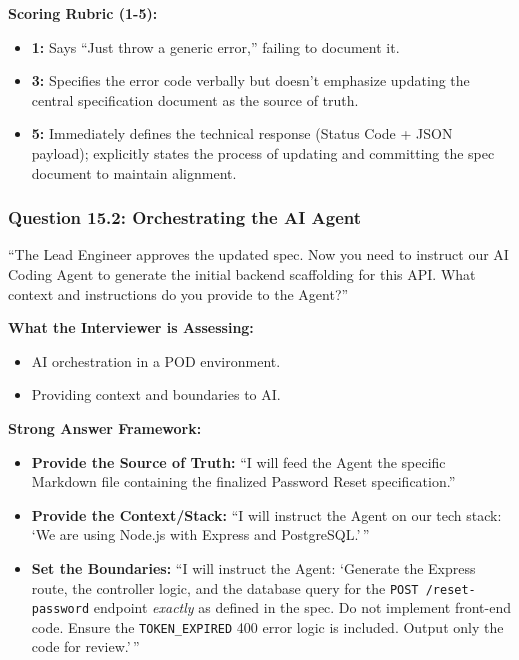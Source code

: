 \documentclass[
  11pt,
  openany,
  oneside]{book}
\providecommand{\tightlist}{%
  \setlength{\itemsep}{0pt}\setlength{\parskip}{0pt}}
\begin{document}
\textbf{Scoring Rubric (1-5):}

\begin{itemize}
\tightlist
\item
  \textbf{1:} Says ``Just throw a generic error,'' failing to document
  it.
\item
  \textbf{3:} Specifies the error code verbally but doesn't emphasize
  updating the central specification document as the source of truth.
\item
  \textbf{5:} Immediately defines the technical response (Status Code +
  JSON payload); explicitly states the process of updating and
  committing the spec document to maintain alignment.
\end{itemize}

\subsubsection{Question 15.2: Orchestrating the AI
Agent}\label{question-15.2-orchestrating-the-ai-agent}

``The Lead Engineer approves the updated spec. Now you need to instruct
our AI Coding Agent to generate the initial backend scaffolding for this
API. What context and instructions do you provide to the Agent?''

\textbf{What the Interviewer is Assessing:}

\begin{itemize}
\tightlist
\item
  AI orchestration in a POD environment.
\item
  Providing context and boundaries to AI.
\end{itemize}

\textbf{Strong Answer Framework:}

\begin{itemize}
\tightlist
\item
  \textbf{Provide the Source of Truth:} ``I will feed the Agent the
  specific Markdown file containing the finalized Password Reset
  specification.''
\item
  \textbf{Provide the Context/Stack:} ``I will instruct the Agent on our
  tech stack: `We are using Node.js with Express and PostgreSQL.'\,''
\item
  \textbf{Set the Boundaries:} ``I will instruct the Agent: `Generate
  the Express route, the controller logic, and the database query for
  the \texttt{POST\ /reset-password} endpoint \emph{exactly} as defined
  in the spec. Do not implement front-end code. Ensure the
  \texttt{TOKEN\_EXPIRED} 400 error logic is included. Output only the
  code for review.'\,''
\end{itemize}
\end{document}
